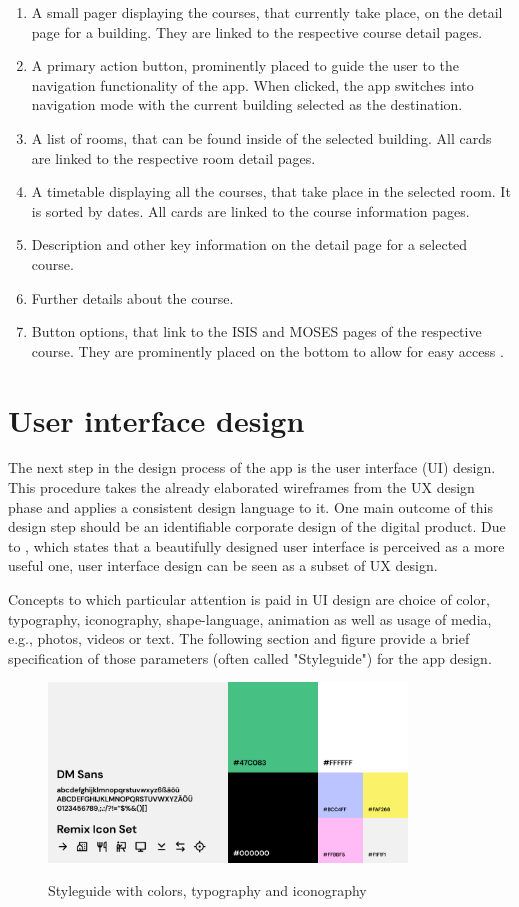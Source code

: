 \begin{enumerate}
    \item A small pager displaying the courses, that currently take place, on the detail page for a building. They are linked to the respective course detail pages.
    \item A primary action button, prominently placed to guide the user to the navigation functionality of the app. When clicked, the app switches into navigation mode with the current building selected as the destination.
    \item A list of rooms, that can be found inside of the selected building. All cards are linked to the respective room detail pages.
    \item A timetable displaying all the courses, that take place in the selected room. It is sorted by dates. All cards are linked to the course information pages.
    \item Description and other key information on the detail page for a selected course.
    \item Further details about the course.
    \item Button options, that link to the ISIS and MOSES pages of the respective course. They are prominently placed on the bottom to allow for easy access \cite{fitts_law}.
\end{enumerate}

\section{User interface design}
The next step in the design process of the app is the user interface (UI) design. This procedure takes the already elaborated wireframes from the UX design phase and applies a consistent design language to it. One main outcome of this design step should be an identifiable corporate design of the digital product. Due to \cite{aesthetic_usability_effect}, which states that a beautifully designed user interface is perceived as a more useful one, user interface design can be seen as a subset of UX design.

Concepts to which particular attention is paid in UI design are choice of color, typography, iconography, shape-language, animation as well as usage of media, e.g., photos, videos or text. The following section and figure provide a brief specification of those parameters (often called "Styleguide") for the app design.

\begin{figure}[H]
	\centering
	\includegraphics[width=0.85\textwidth]{images/styleguide.png}\\
	\caption{Styleguide with colors, typography and iconography}
\end{figure}

